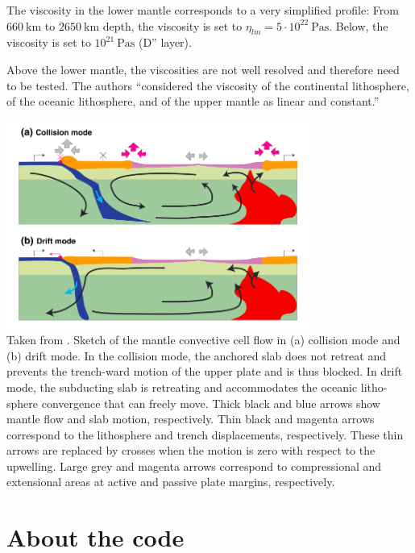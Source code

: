 The viscosity in the lower mantle corresponds
to a very simplified profile: From $660~\si{\km}$ to $2650~\si{\km}$ depth,
the viscosity is set to $\eta_{lm}=5\cdot 10^{22}~\si{\pascal\second}$. 
Below, the viscosity is set to $10^{21}~\si{\pascal\second}$ (D'' layer). 

Above the lower mantle, the viscosities
are not well resolved and therefore need to be tested.
The authors ``considered the viscosity of the continental 
lithosphere, of the oceanic lithosphere, and of the
upper mantle as linear and constant.''

\begin{center}
\includegraphics[width=10cm]{python_codes/fieldstone_143/images/yahb13_b}\\
{\captionfont 
Taken from \cite{yahb13}. 
Sketch of the mantle convective cell flow in (a) collision mode and (b) drift mode. In the
collision mode, the anchored slab does not retreat and prevents the trench-ward motion of the upper plate
and is thus blocked. In drift mode, the subducting slab is retreating and accommodates the oceanic litho-
sphere convergence that can freely move. Thick black and blue arrows show mantle flow and slab motion,
respectively. Thin black and magenta arrows correspond to the lithosphere and trench displacements,
respectively. These thin arrows are replaced by crosses when the motion is zero with respect to the upwelling.
Large grey and magenta arrows correspond to compressional and extensional areas at active and passive plate
margins, respectively.
}
\end{center}

\section*{About the code}


